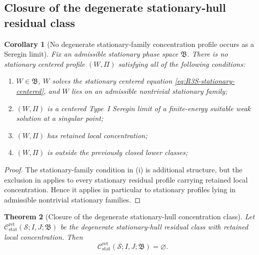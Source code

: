 \documentclass[11pt]{amsart}
\numberwithin{equation}{section}
\theoremstyle{plain}
\newtheorem{theorem}{Theorem}[section]
\newtheorem{corollary}[theorem]{Corollary}
\theoremstyle{definition}
\theoremstyle{remark}
\newcommand{\Cstat}{\mathcal C_{\mathrm{stat}}^{\mathrm{ret}}}
\begin{document}
\subsection{Closure of the degenerate stationary-hull residual class}

\begin{corollary}[No degenerate stationary-family concentration profile occurs as a Seregin limit]
\label{cor:R3S-no-active-degenerate-family}
Fix an admissible stationary phase space \(\mathfrak B\).  There is no stationary
centered profile \((W,\Pi)\) satisfying all of the following conditions:
\begin{enumerate}[label=(\roman*)]
   \item \(W\in\mathfrak B\), \(W\) solves the stationary centered equation
   \eqref{eq:R3S-stationary-centered}, and \(W\) lies on an admissible
   nontrivial stationary family;
   \item \((W,\Pi)\) is a centered Type~I Seregin limit of a finite-energy
   suitable weak solution at a singular point;
   \item \((W,\Pi)\) has retained local concentration;
   \item \((W,\Pi)\) is outside the previously closed lower classes;
\end{enumerate}
\end{corollary}

\begin{proof}
The stationary-family condition in (i) is additional structure, but the exclusion in
 applies to every stationary
residual profile carrying retained local concentration.  Hence it applies in
particular to stationary profiles lying in admissible nontrivial stationary
families.
\end{proof}

\begin{theorem}[Closure of the degenerate stationary-hull concentration class]
\label{thm:R3S-R3-empty}
Let \(\Cstat(\mathcal S;I,J;\mathfrak B)\) be the degenerate
stationary-hull residual class with retained local concentration.  Then
\begin{equation}\label{eq:R3S-R3-empty}
   \Cstat(\mathcal S;I,J;\mathfrak B)=\varnothing .
\end{equation}
\end{theorem}
\end{document}
